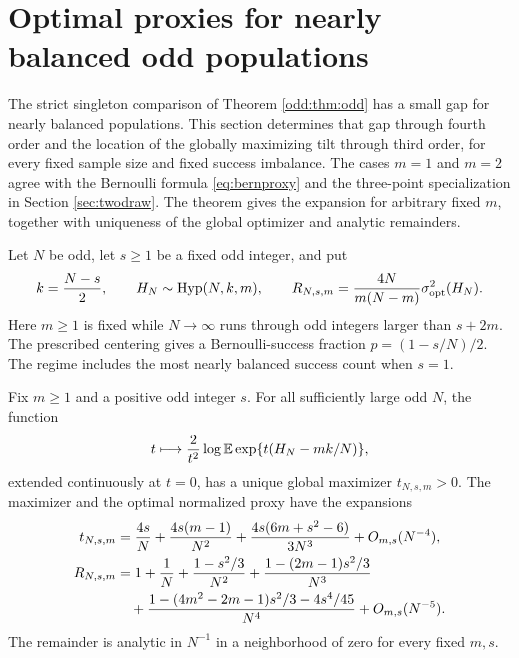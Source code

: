 \section{Optimal proxies for nearly balanced odd populations}\label{sec:odd_asym}
The strict singleton comparison of Theorem \ref{odd:thm:odd} has a small gap for nearly balanced populations. This section determines that gap through fourth order and the location of the globally maximizing tilt through third order, for every fixed sample size and fixed success imbalance. The cases $m=1$ and $m=2$ agree with the Bernoulli formula \eqref{eq:bernproxy} and the three-point specialization in Section \ref{sec:twodraw}. The theorem gives the expansion for arbitrary fixed $m$, together with uniqueness of the global optimizer and analytic remainders.

Let $N$ be odd, let $s\ge1$ be a fixed odd integer, and put
\begin{equation}\label{eq:oddparams}
 k=\frac{N-s}{2},\qquad H_N\sim\operatorname{Hyp}(N,k,m),\qquad
 R_{N,s,m}=\frac{4N}{m(N-m)}\sigma^2_{\mathrm{opt}}(H_N).
\end{equation}
Here $m\ge1$ is fixed while $N\to\infty$ runs through odd integers larger than $s+2m$. The prescribed centering gives a Bernoulli-success fraction $p=(1-s/N)/2$. The regime includes the most nearly balanced success count when $s=1$.

\begin{theorem}\label{thm:odd_expansion}
Fix $m\ge1$ and a positive odd integer $s$. For all sufficiently large odd $N$, the function
\[
 t\longmapsto\frac{2}{t^2}\log\mathbb E\exp\{t(H_N-mk/N)\},
\]
extended continuously at $t=0$, has a unique global maximizer $t_{N,s,m}>0$. The maximizer and the optimal normalized proxy have the expansions
\begin{align}
 t_{N,s,m}&=\frac{4s}{N}+\frac{4s(m-1)}{N^2}
 +\frac{4s(6m+s^2-6)}{3N^3}+O_{m,s}(N^{-4}),\label{eq:tiltexp}\\
 R_{N,s,m}
 &=1+\frac1N+\frac{1-s^2/3}{N^2}
 +\frac{1-(2m-1)s^2/3}{N^3}\notag\\
 &\quad+\frac{1-(4m^2-2m-1)s^2/3-4s^4/45}{N^4}
 +O_{m,s}(N^{-5}).\label{eq:Rexp}
\end{align}
The remainder is analytic in $N^{-1}$ in a neighborhood of zero for every fixed $m,s$.
\end{theorem}

